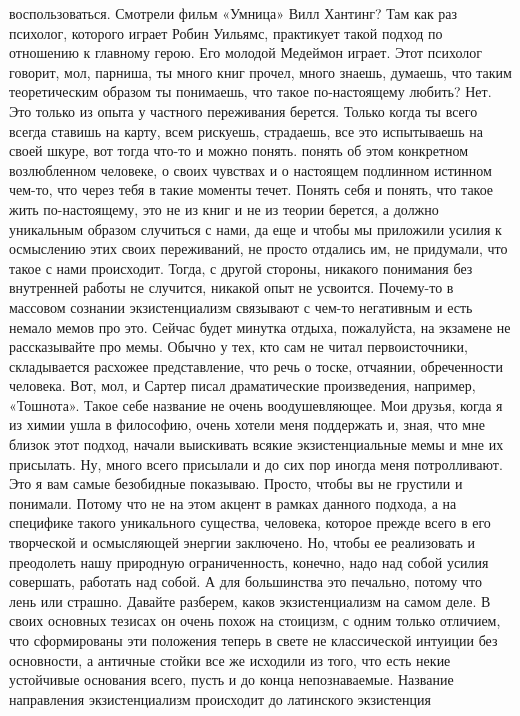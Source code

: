воспользоваться. Смотрели фильм «Умница» Вилл Хантинг? Там как раз психолог,
которого играет Робин Уильямс, практикует такой подход по отношению к главному
герою. Его молодой Медеймон играет. Этот психолог говорит, мол, парниша, ты
много книг прочел, много знаешь, думаешь, что таким теоретическим образом ты
понимаешь, что такое по-настоящему любить? Нет. Это только из опыта у частного
переживания берется. Только когда ты всего всегда ставишь на карту, всем
рискуешь, страдаешь, все это испытываешь на своей шкуре, вот тогда что-то и
можно понять. понять об этом конкретном возлюбленном человеке, о своих чувствах
и о настоящем подлинном истинном чем-то, что через тебя в такие моменты течет.
Понять себя и понять, что такое жить по-настоящему, это не из книг и не из
теории берется, а должно уникальным образом случиться с нами, да еще и чтобы мы
приложили усилия к осмыслению этих своих переживаний, не просто отдались им, не
придумали, что такое с нами происходит. Тогда, с другой стороны, никакого
понимания без внутренней работы не случится, никакой опыт не усвоится. Почему-то
в массовом сознании экзистенциализм связывают с чем-то негативным и есть немало
мемов про это. Сейчас будет минутка отдыха, пожалуйста, на экзамене не
рассказывайте про мемы. Обычно у тех, кто сам не читал первоисточники,
складывается расхожее представление, что речь о тоске, отчаянии, обреченности
человека. Вот, мол, и Сартер писал драматические произведения, например,
«Тошнота». Такое себе название не очень воодушевляющее. Мои друзья, когда я из
химии ушла в философию, очень хотели меня поддержать и, зная, что мне близок
этот подход, начали выискивать всякие экзистенциальные мемы и мне их присылать.
Ну, много всего присылали и до сих пор иногда меня потролливают. Это я вам самые
безобидные показываю. Просто, чтобы вы не грустили и понимали. Потому что не на
этом акцент в рамках данного подхода, а на специфике такого уникального
существа, человека, которое прежде всего в его творческой и осмысляющей энергии
заключено. Но, чтобы ее реализовать и преодолеть нашу природную ограниченность,
конечно, надо над собой усилия совершать, работать над собой. А для большинства
это печально, потому что лень или страшно. Давайте разберем, каков
экзистенциализм на самом деле. В своих основных тезисах он очень похож на
стоицизм, с одним только отличием, что сформированы эти положения теперь в свете
не классической интуиции без основности, а античные стойки все же исходили из
того, что есть некие устойчивые основания всего, пусть и до конца непознаваемые.
Название направления экзистенциализм происходит до латинского экзистенция
